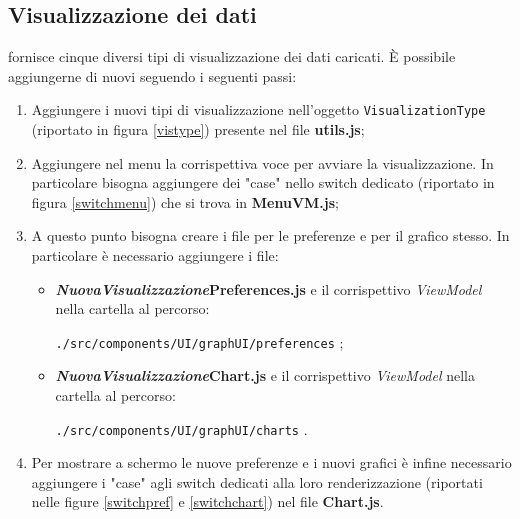 \subsection{Visualizzazione dei dati}
\NomeProgetto{} fornisce cinque diversi tipi di visualizzazione dei dati caricati. È possibile aggiungerne di nuovi seguendo i seguenti passi:
\begin{enumerate}[label=\textbf{\arabic*})]
	\item Aggiungere i nuovi tipi di visualizzazione nell'oggetto \texttt{VisualizationType} (riportato in figura \ref{vistype}) presente nel file \textbf{utils.js};
	\item Aggiungere nel menu la corrispettiva voce per avviare la visualizzazione. In particolare bisogna aggiungere dei "case" nello switch dedicato (riportato in figura \ref{switchmenu}) che si trova in \textbf{MenuVM.js};
	\item A questo punto bisogna creare i file per le preferenze e per il grafico stesso. In particolare è necessario aggiungere i file:
	\begin{itemize}
		\item \textbf{\textit{NuovaVisualizzazione}Preferences.js} e il corrispettivo \textit{ViewModel} nella cartella al percorso:
	\begin{center}
		\texttt{./src/components/UI/graphUI/preferences} ;
	\end{center}			
		
		\item \textbf{\textit{NuovaVisualizzazione}Chart.js} e il corrispettivo \textit{ViewModel} nella cartella al percorso:
	\begin{center}
		\texttt{./src/components/UI/graphUI/charts} .
	\end{center}		
	\end{itemize}		
	\item Per mostrare a schermo le nuove preferenze e i nuovi grafici è infine necessario aggiungere i "case" agli switch dedicati alla loro renderizzazione (riportati nelle figure \ref{switchpref} e \ref{switchchart}) nel file \textbf{Chart.js}.
\end{enumerate}

